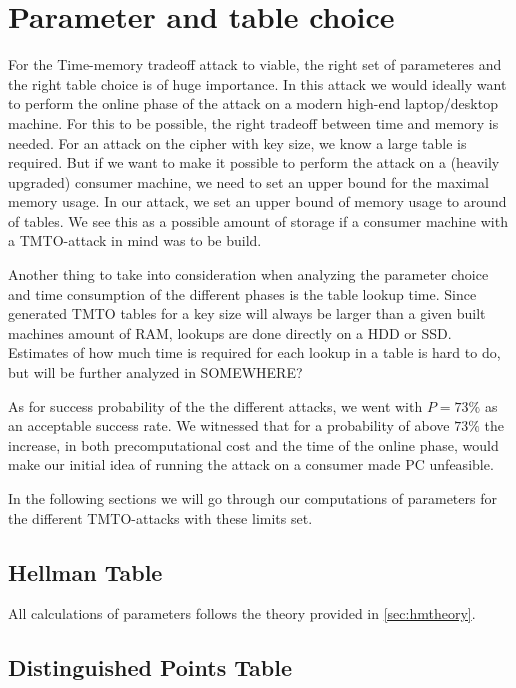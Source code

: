 \chapter{Parameter and table choice}
\label{ch:param}
For the Time-memory tradeoff attack to viable, the right set of
parameteres and the right table choice is of huge importance. In this
attack we would ideally want to perform the online phase of the  attack on a modern
high-end laptop/desktop machine. For this to be possible, the right
tradeoff between time and memory is needed. For an attack on the
cipher with  key size, we know a large table is required. But if
we want to make it possible to perform the attack on a (heavily
upgraded) consumer
machine, we need to set an upper bound for the maximal memory
usage. In our attack, we set an upper bound of memory usage to around
 of tables. We see this as a possible amount of storage if a
consumer machine with a TMTO-attack in mind was to be build. 

Another thing to take into consideration when analyzing the parameter
choice and time consumption of the different phases is the table lookup
time. Since generated TMTO tables for a  key size will
always be larger than a given built machines amount of RAM, lookups are
done directly on a HDD or SSD. Estimates of how much time is required
for each lookup in a table is hard to do, but will be further analyzed
in SOMEWHERE? 

As for success probability of the 
the different attacks, we went with $P = 73\%$ as an acceptable
success rate.
We witnessed that for a probability of above $73\%$ the increase,
in both precomputational cost and the time of the online phase, would
make our initial idea of running the attack on a consumer made PC
unfeasible.

In the following sections we will go through our computations of
parameters for the different TMTO-attacks with these limits set.

\section{Hellman Table}

All calculations of parameters follows the theory provided in \ref{sec:hmtheory}.

\section{Distinguished Points Table}

